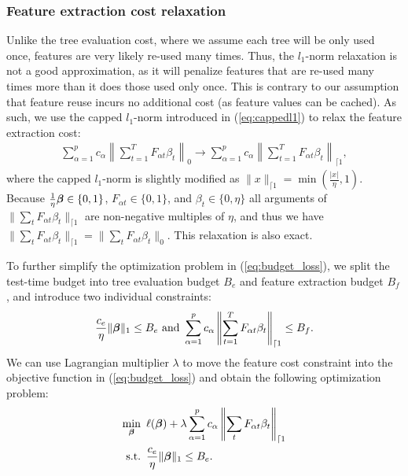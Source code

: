 \subsubsection{Feature extraction cost relaxation}
Unlike the tree evaluation cost, where we assume each tree will be only used once, features are very likely re-used many times. Thus, the $l_1$-norm relaxation is not a good approximation, as it will penalize features that are re-used many times more than it does those used only once. This is contrary to our assumption that feature reuse incurs no additional cost (as feature values can be cached). As such, we use the capped $l_1$-norm introduced in (\ref{eq:cappedl1}) to relax the feature extraction cost:
\begin{align}
	\!\sum_{\alpha=1}^p\!c_\alpha\left\|\sum_{t=1}^T F_{\alpha t} \beta_t\right\|_0\! \longrightarrow  \!\sum_{\alpha=1}^p c_{\alpha} \left\|\sum_{t=1}^T F_{\alpha t} \beta_t\right\|_{\lceil 1}, \label{eq:relax_featurecost}
\end{align}
where the capped $l_1$-norm is slightly modified as $\|x\|_{\lceil 1}= \min(\frac{|x|}{\eta}, 1)$. 
Because $\frac{1}{\eta}\boldsymbol{\beta}  \in \{0,1\}$, $F_{\alpha t} \in \{0,1\}$, and $\beta_t \in \{0, \eta\}$ all arguments of $\|\sum_t F_{\alpha t}\beta_t\|_{\lceil 1}$ 
are non-negative multiples of $\eta$, and thus we have $\|\sum_t F_{\alpha t}\beta_t\|_{\lceil 1} = \|\sum_t F_{\alpha t}\beta_t\|_0$. This relaxation is also exact.

To further simplify the optimization problem in (\ref{eq:budget_loss}), we split the test-time budget into tree evaluation budget $B_e$ and feature extraction budget $B_f$, and introduce two individual constraints:
\begin{align}
	\frac{c_e}{\eta} \|\boldsymbol{\beta}\|_1 \le B_e \textrm{ and } \sum_{\alpha=1}^p c_{\alpha} \left\|\sum_{t=1}^T F_{\alpha t} \beta_t\right\|_{\lceil 1} \le B_f.
\end{align}
We can use Lagrangian multiplier $\lambda$ to move the feature cost constraint into the objective function in (\ref{eq:budget_loss}) and obtain the following optimization problem:
\begin{align}
    \min_{\boldsymbol{\beta}} & \hspace{5pt} \ell(\boldsymbol{\beta}) + \lambda \sum_{\alpha=1}^p c_{\alpha} \left\|\sum_t F_{\alpha t} \beta_t\right\|_{\lceil 1} \label{eq:opt}\\
	\textrm{s.t.} & \hspace{5pt} \frac{c_e}{\eta}\|\boldsymbol{\beta}\|_1 \le B_e. \nonumber	
\end{align} 

